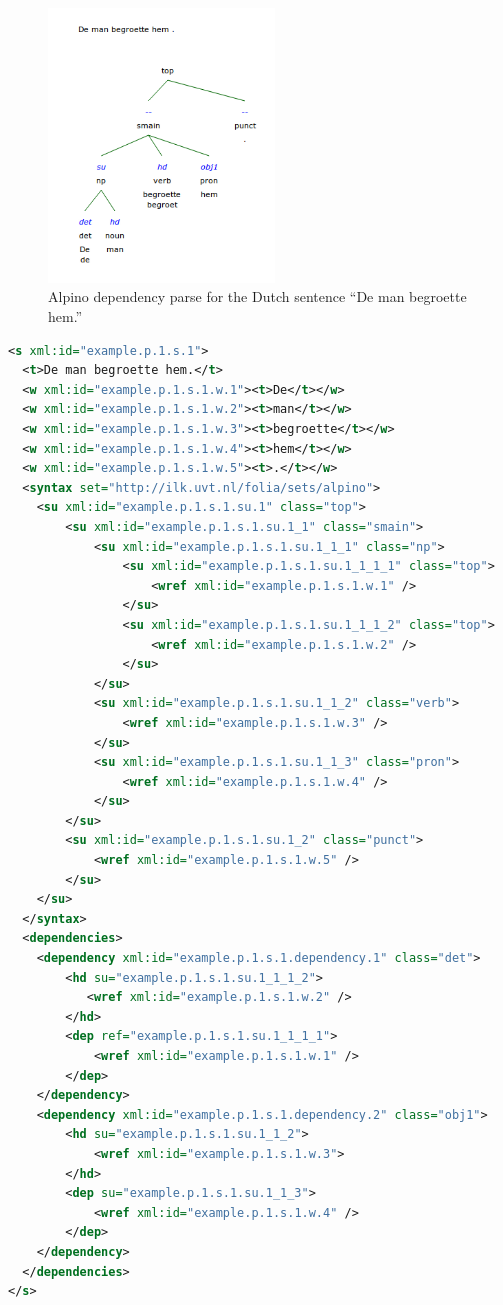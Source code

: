 \documentclass[a4paper,12pt]{report}
\begin{document}
\begin{figure}[h]
\begin{center}
\includegraphics[width=60.0mm]{alpino.png}
\end{center}
\caption{Alpino dependency parse for the Dutch sentence ``De man begroette hem.''}
\label{fig:arch} 
\end{figure}
\FloatBarrier

\begin{lstlisting}[language=xml]
<s xml:id="example.p.1.s.1">
  <t>De man begroette hem.</t>
  <w xml:id="example.p.1.s.1.w.1"><t>De</t></w>
  <w xml:id="example.p.1.s.1.w.2"><t>man</t></w>
  <w xml:id="example.p.1.s.1.w.3"><t>begroette</t></w>
  <w xml:id="example.p.1.s.1.w.4"><t>hem</t></w>
  <w xml:id="example.p.1.s.1.w.5"><t>.</t></w>
  <syntax set="http://ilk.uvt.nl/folia/sets/alpino">
    <su xml:id="example.p.1.s.1.su.1" class="top">     
        <su xml:id="example.p.1.s.1.su.1_1" class="smain">     
            <su xml:id="example.p.1.s.1.su.1_1_1" class="np">     
                <su xml:id="example.p.1.s.1.su.1_1_1_1" class="top">     
                    <wref xml:id="example.p.1.s.1.w.1" />       
                </su>
                <su xml:id="example.p.1.s.1.su.1_1_1_2" class="top">     
                    <wref xml:id="example.p.1.s.1.w.2" />
                </su> 
            </su>
            <su xml:id="example.p.1.s.1.su.1_1_2" class="verb">     
                <wref xml:id="example.p.1.s.1.w.3" />   
            </su>
            <su xml:id="example.p.1.s.1.su.1_1_3" class="pron">     
                <wref xml:id="example.p.1.s.1.w.4" />   
            </su>
        </su>
        <su xml:id="example.p.1.s.1.su.1_2" class="punct">
            <wref xml:id="example.p.1.s.1.w.5" />               
        </su> 
    </su>
  </syntax>
  <dependencies>
    <dependency xml:id="example.p.1.s.1.dependency.1" class="det">
        <hd su="example.p.1.s.1.su.1_1_1_2">
           <wref xml:id="example.p.1.s.1.w.2" />   
        </hd>
        <dep ref="example.p.1.s.1.su.1_1_1_1">
            <wref xml:id="example.p.1.s.1.w.1" />   
        </dep>
    </dependency>
    <dependency xml:id="example.p.1.s.1.dependency.2" class="obj1">
        <hd su="example.p.1.s.1.su.1_1_2">
            <wref xml:id="example.p.1.s.1.w.3">
        </hd>
        <dep su="example.p.1.s.1.su.1_1_3">
            <wref xml:id="example.p.1.s.1.w.4" />   
        </dep>
    </dependency>
  </dependencies>
</s>
\end{lstlisting}
\end{document}
